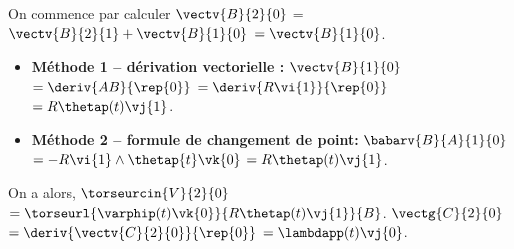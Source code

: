 \begin{corrigebox}
On commence par calculer $\vectv{B}{2}{0}$ = $\vectv{B}{2}{1}+\vectv{B}{1}{0}$ $=\vectv{B}{1}{0}$.
\begin{itemize}
\item \textbf{Méthode 1 -- dérivation vectorielle :}  $\vectv{B}{1}{0}$ $=\deriv{AB}{\rep{0}}$ 
$=\deriv{R\vi{1}}{\rep{0}}$ 
$= R\thetap(t) \vj{1}$. 
\item \textbf{Méthode 2 -- formule de changement de point: }
$\babarv{B}{A}{1}{0}$ 
$= -R\vi{1}\wedge \thetap{t} \vk{0}$
$= R\thetap(t) \vj{1}$.
\end{itemize}

On a alors, 
$\torseurcin{V}{2}{0}$
$=\torseurl{\varphip(t)\vk{0}}{R\thetap(t) \vj{1}}{B}$.
$\vectg{C}{2}{0}$
$=\deriv{\vectv{C}{2}{0}}{\rep{0}}$
$=\lambdapp(t) \vj{0} $.
\end{corrigebox}
